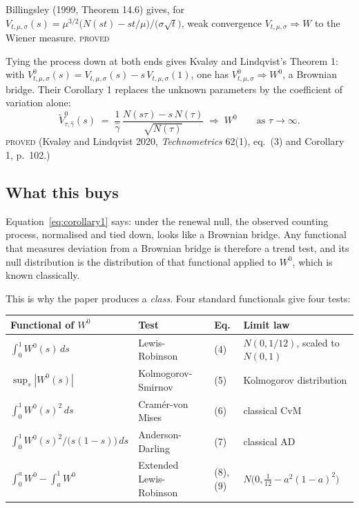 \documentclass[11pt,a4paper]{article}
\newcommand{\Vtilde}{\widetilde{V}^{0}_{\tau,\hat\gamma}}
\newcommand{\Wbridge}{W^{0}}
\newcommand{\gh}{\hat\gamma}
\newcommand{\Ntau}{N(\tau)}
\newcommand{\PROVED}{\textsc{\textcolor{blue!55!black}{proved}}}
\begin{document}
Billingsley (1999, Theorem 14.6) gives, for
$V_{t,\mu,\sigma}(s) = \mu^{3/2}\bigl(N(st) - st/\mu\bigr)/\bigl(\sigma\sqrt{t}\bigr)$,
weak convergence $V_{t,\mu,\sigma} \Rightarrow W$ to the Wiener measure. \PROVED

Tying the process down at both ends gives Kvaløy and Lindqvist's Theorem 1: with
$V^0_{t,\mu,\sigma}(s) = V_{t,\mu,\sigma}(s) - s\,V_{t,\mu,\sigma}(1)$, one has
$V^0_{t,\mu,\sigma} \Rightarrow \Wbridge$, a Brownian bridge. Their Corollary 1 replaces
the unknown parameters by the coefficient of variation alone:
%
\begin{equation}
\Vtilde(s) \;=\; \frac{1}{\gh}\,\frac{N(s\tau) - s\,\Ntau}{\sqrt{\Ntau}}
\;\Longrightarrow\; \Wbridge
\qquad\text{as } \tau \to \infty .
\label{eq:corollary1}
\end{equation}
\PROVED{} (Kvaløy and Lindqvist 2020, \emph{Technometrics} 62(1), eq.~(3) and Corollary 1,
p.~102.)

\subsection{What this buys}

Equation~\eqref{eq:corollary1} says: under the renewal null, the observed counting
process, normalised and tied down, looks like a Brownian bridge. Any functional that
measures deviation from a Brownian bridge is therefore a trend test, and its null
distribution is the distribution of that functional applied to $\Wbridge$, which is
known classically.

This is why the paper produces a \emph{class}. Four standard functionals give four
tests:

\begin{center}
\small
\begin{tabular}{@{}llll@{}}
\toprule
\textbf{Functional of $\Wbridge$} & \textbf{Test} & \textbf{Eq.} & \textbf{Limit law}\\
\midrule
$\int_0^1 \Wbridge(s)\,ds$ & Lewis-Robinson & (4) & $N(0, 1/12)$, scaled to $N(0,1)$\\
$\sup_s |\Wbridge(s)|$ & Kolmogorov-Smirnov & (5) & Kolmogorov distribution\\
$\int_0^1 \Wbridge(s)^2\,ds$ & Cramér-von Mises & (6) & classical CvM\\
$\int_0^1 \Wbridge(s)^2 / \bigl(s(1-s)\bigr)\,ds$ & Anderson-Darling & (7) & classical AD\\
\midrule
$\int_0^a \Wbridge - \int_a^1 \Wbridge$ & Extended Lewis-Robinson & (8), (9) &
$N\bigl(0, \tfrac{1}{12} - a^2(1-a)^2\bigr)$\\
\bottomrule
\end{tabular}
\end{center}
\end{document}
